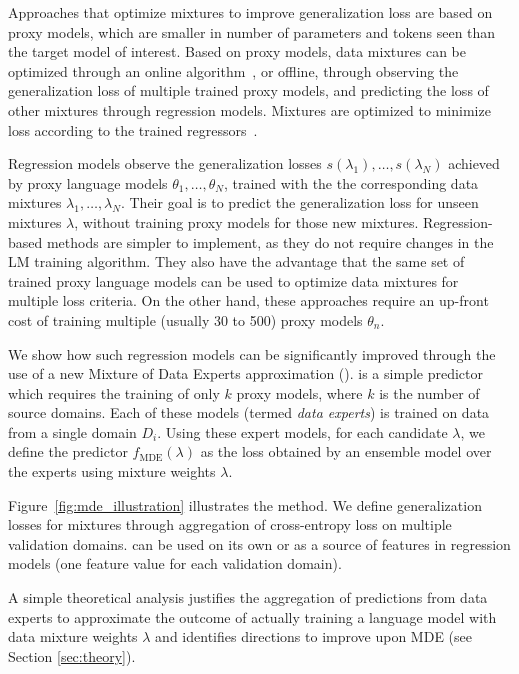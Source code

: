 Approaches that optimize mixtures to improve generalization loss are based on proxy models, which are smaller in number of parameters and  tokens seen than the target model of interest.  Based on proxy models, data mixtures can be optimized through an online algorithm~\cite{DOGE,doremi}, or offline, through observing the generalization loss of multiple trained proxy models, and predicting the loss of other mixtures through regression models. Mixtures are optimized to minimize loss according to the trained regressors~\cite{regmix,dml,bimix}.



Regression models observe the generalization losses $s(\lambda_1),\ldots,s(\lambda_N)$ achieved by proxy language models $\theta_1,\ldots,\theta_N$, trained with the the corresponding data mixtures $\lambda_1,\ldots,\lambda_N$. Their goal is to predict the generalization loss for unseen mixtures $\lambda$, without training proxy models for those new mixtures.  Regression-based methods are simpler to implement, as they do not require changes in the LM training algorithm.  They also have the advantage that the  same set of trained proxy language models can be used to optimize data mixtures for multiple loss criteria. On the other hand, these approaches require an up-front cost of training multiple (usually 30 to 500) proxy models $\theta_n$.


We show how such regression models can be significantly improved through the use of a new Mixture of Data Experts approximation ({\mde}).  {\mde} is a simple predictor which requires the training of only $k$ proxy models, where $k$ is the number of source domains. Each of these models (termed \emph{data experts}) is trained on data from a single domain $D_i$. Using these expert models, for each candidate $\lambda$, we define the predictor
$f_\text{MDE}(\lambda)$ as the loss obtained by an ensemble model over the experts using mixture weights $\lambda$. 

Figure~\ref{fig:mde_illustration} illustrates the method. We define generalization losses for mixtures through aggregation of cross-entropy loss on multiple validation domains. {\mde} can be used on its own or as a source of features in regression models (one feature value for each validation domain). 

A simple theoretical analysis justifies the aggregation of predictions from data experts to approximate the outcome of actually training a language model with data mixture weights $\lambda$ and identifies directions to improve upon MDE (see Section \ref{sec:theory}).



